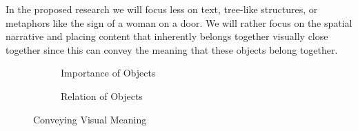 \documentclass[twoside]{article}
\begin{document}
In the proposed research we will focus less on text, tree-like structures, or metaphors like the sign of a woman on a door. We will rather focus on the spatial narrative and placing content that inherently belongs together visually close together since this can convey the meaning that these objects belong together.\\

\begin{figure}[H]
        \centering
        \begin{subfigure}[b]{0.3\textwidth}
                \caption{Importance of Objects}
                \label{fig:imp_objects}
        \end{subfigure}%
        \qquad %
        \begin{subfigure}[b]{0.3\textwidth}
                \caption{Relation of Objects}
                \label{fig:rel_objects}
        \end{subfigure}
        \caption{Conveying Visual Meaning}\label{fig:Objects}
\end{figure}
\end{document}
